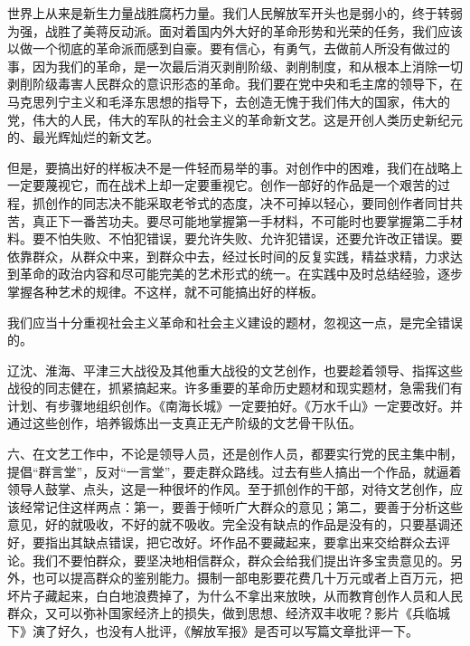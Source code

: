 世界上从来是新生力量战胜腐朽力量。我们人民解放军开头也是弱小的，终于转弱为强，战胜了美蒋反动派。面对着国内外大好的革命形势和光荣的任务，我们应该以做一个彻底的革命派而感到自豪。要有信心，有勇气，去做前人所没有做过的事，因为我们的革命，是一次最后消灭剥削阶级、剥削制度，和从根本上消除一切剥削阶级毒害人民群众的意识形态的革命。我们要在党中央和毛主席的领导下，在马克思列宁主义和毛泽东思想的指导下，去创造无愧于我们伟大的国家，伟大的党，伟大的人民，伟大的军队的社会主义的革命新文艺。这是开创人类历史新纪元的、最光辉灿烂的新文艺。

但是，要搞出好的样板决不是一件轻而易举的事。对创作中的困难，我们在战略上一定要蔑视它，而在战术上却一定要重视它。创作一部好的作品是一个艰苦的过程，抓创作的同志决不能采取老爷式的态度，决不可掉以轻心，要同创作者同甘共苦，真正下一番苦功夫。要尽可能地掌握第一手材料，不可能时也要掌握第二手材料。要不怕失败、不怕犯错误，要允许失败、允许犯错误，还要允许改正错误。要依靠群众，从群众中来，到群众中去，经过长时间的反复实践，精益求精，力求达到革命的政治内容和尽可能完美的艺术形式的统一。在实践中及时总结经验，逐步掌握各种艺术的规律。不这样，就不可能搞出好的样板。

我们应当十分重视社会主义革命和社会主义建设的题材，忽视这一点，是完全错误的。

辽沈、淮海、平津三大战役及其他重大战役的文艺创作，也要趁着领导、指挥这些战役的同志健在，抓紧搞起来。许多重要的革命历史题材和现实题材，急需我们有计划、有步骤地组织创作。《南海长城》一定要拍好。《万水千山》一定要改好。并通过这些创作，培养锻炼出一支真正无产阶级的文艺骨干队伍。

六、在文艺工作中，不论是领导人员，还是创作人员，都要实行党的民主集中制，提倡“群言堂”，反对“一言堂”，要走群众路线。过去有些人搞出一个作品，就逼着领导人鼓掌、点头，这是一种很坏的作风。至于抓创作的干部，对待文艺创作，应该经常记住这样两点：第一，要善于倾听广大群众的意见；第二，要善于分析这些意见，好的就吸收，不好的就不吸收。完全没有缺点的作品是没有的，只要基调还好，要指出其缺点错误，把它改好。坏作品不要藏起来，要拿出来交给群众去评论。我们不要怕群众，要坚决地相信群众，群众会给我们提出许多宝贵意见的。另外，也可以提高群众的鉴别能力。摄制一部电影要花费几十万元或者上百万元，把坏片子藏起来，白白地浪费掉了，为什么不拿出来放映，从而教育创作人员和人民群众，又可以弥补国家经济上的损失，做到思想、经济双丰收呢？影片《兵临城下》演了好久，也没有人批评，《解放军报》是否可以写篇文章批评一下。

